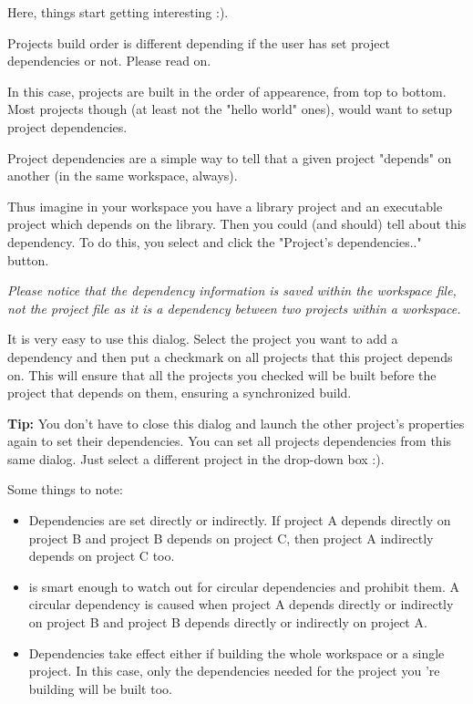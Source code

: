 Here, things start getting interesting :).

Projects build order is different depending if the user has set project dependencies or not. Please read on.


In this case, projects are built in the order of appearence, from top to bottom. Most projects though (at least not the "hello world" ones), would want to setup project dependencies.


Project dependencies are a simple way to tell \codeblocks that a given project "depends" on another (in the same workspace, always).

Thus imagine in your workspace you have a library project and an executable project which depends on the library. Then you could (and should) tell \codeblocks about this dependency. To do this, you select  and click the "Project's dependencies.." button.

\textit{Please notice that the dependency information is saved within the workspace file, not the project file as it is a dependency between two projects within a workspace.}


It is very easy to use this dialog. Select the project you want to add a dependency and then put a checkmark on all projects that this project depends on. This will ensure that all the projects you checked will be built before the project that depends on them, ensuring a synchronized build.

\textbf{Tip:} You don't have to close this dialog and launch the other project's properties again to set their dependencies. You can set all projects dependencies from this same dialog. Just select a different project in the drop-down box :).

Some things to note:

\begin{itemize}
\item Dependencies are set directly or indirectly. If project A depends directly on project B and project B depends on project C, then project A indirectly depends on project C too.
\item \codeblocks is smart enough to watch out for circular dependencies and prohibit them. A circular dependency is caused when project A depends directly or indirectly on project B and project B depends directly or indirectly on project A.
\item Dependencies take effect either if building the whole workspace or a single project. In this case, only the dependencies needed for the project you 're building will be built too.
\end{itemize}

